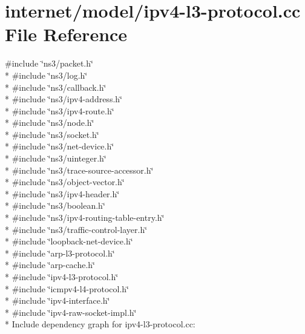 \hypertarget{ipv4-l3-protocol_8cc}{}\section{internet/model/ipv4-\/l3-\/protocol.cc File Reference}
\label{ipv4-l3-protocol_8cc}
{\ttfamily \#include \char`\"{}ns3/packet.\+h\char`\"{}}\\*
{\ttfamily \#include \char`\"{}ns3/log.\+h\char`\"{}}\\*
{\ttfamily \#include \char`\"{}ns3/callback.\+h\char`\"{}}\\*
{\ttfamily \#include \char`\"{}ns3/ipv4-\/address.\+h\char`\"{}}\\*
{\ttfamily \#include \char`\"{}ns3/ipv4-\/route.\+h\char`\"{}}\\*
{\ttfamily \#include \char`\"{}ns3/node.\+h\char`\"{}}\\*
{\ttfamily \#include \char`\"{}ns3/socket.\+h\char`\"{}}\\*
{\ttfamily \#include \char`\"{}ns3/net-\/device.\+h\char`\"{}}\\*
{\ttfamily \#include \char`\"{}ns3/uinteger.\+h\char`\"{}}\\*
{\ttfamily \#include \char`\"{}ns3/trace-\/source-\/accessor.\+h\char`\"{}}\\*
{\ttfamily \#include \char`\"{}ns3/object-\/vector.\+h\char`\"{}}\\*
{\ttfamily \#include \char`\"{}ns3/ipv4-\/header.\+h\char`\"{}}\\*
{\ttfamily \#include \char`\"{}ns3/boolean.\+h\char`\"{}}\\*
{\ttfamily \#include \char`\"{}ns3/ipv4-\/routing-\/table-\/entry.\+h\char`\"{}}\\*
{\ttfamily \#include \char`\"{}ns3/traffic-\/control-\/layer.\+h\char`\"{}}\\*
{\ttfamily \#include \char`\"{}loopback-\/net-\/device.\+h\char`\"{}}\\*
{\ttfamily \#include \char`\"{}arp-\/l3-\/protocol.\+h\char`\"{}}\\*
{\ttfamily \#include \char`\"{}arp-\/cache.\+h\char`\"{}}\\*
{\ttfamily \#include \char`\"{}ipv4-\/l3-\/protocol.\+h\char`\"{}}\\*
{\ttfamily \#include \char`\"{}icmpv4-\/l4-\/protocol.\+h\char`\"{}}\\*
{\ttfamily \#include \char`\"{}ipv4-\/interface.\+h\char`\"{}}\\*
{\ttfamily \#include \char`\"{}ipv4-\/raw-\/socket-\/impl.\+h\char`\"{}}\\*
Include dependency graph for ipv4-\/l3-\/protocol.cc\+:
